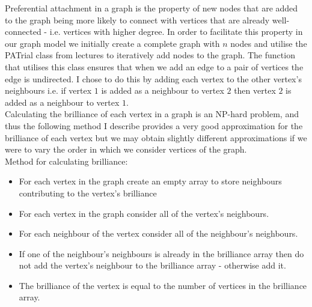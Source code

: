 \documentclass[12pt, a4paper]{article}
\begin{document}
Preferential attachment in a graph is the property of new nodes that are added to the graph being more likely to connect with vertices that are already well-connected - i.e. vertices with higher degree. In order to facilitate this property in our graph model we initially create a complete graph with $n$ nodes and utilise the PATrial class from lectures to iteratively add nodes to the graph. The function that utilises this class ensures that when we add an edge to a pair of vertices the edge is undirected. I chose to do this by adding each vertex to the other vertex's neighbours i.e. if vertex $1$ is added as a neighbour to vertex $2$ then vertex $2$ is added as a neighbour to vertex $1$.\\
Calculating the brilliance of each vertex in a graph is an NP-hard problem, and thus the following method I describe provides a very good approximation for the brilliance of each vertex but we may obtain slightly different approximations if we were to vary the order in which we consider vertices of the graph.\\
Method for calculating brilliance:
\begin{itemize}
\item For each vertex in the graph create an empty array to store neighbours contributing to the vertex's brilliance
\item For each vertex in the graph consider all of the vertex's neighbours.
\item For each neighbour of the vertex consider all of the neighbour's neighbours.
\item If one of the neighbour's neighbours is already in the brilliance array then do not add the vertex's neighbour to the brilliance array - otherwise add it.
\item The brilliance of the vertex is equal to the number of vertices in the brilliance array.
\end{itemize}

\newpage
\end{document}
